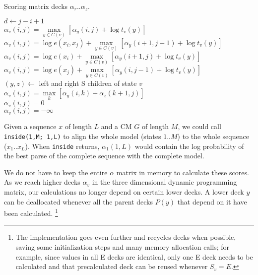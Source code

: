 \documentclass[11pt]{article}
\begin{document}
\begin{algorithm}
         {Scoring matrix decks $\alpha_r..\alpha_z$.}
\begin{algtab*}
       $d \leftarrow j-i+1$\\
       	$\alpha_v(i,j) = \max\limits_{y \in C(v)} \left[ \alpha_y(i,j)  + \log t_v(y) \right]$\\
	$\alpha_v(i,j) = \log e(x_i, x_j) + \max\limits_{y \in C(v)} \left[ \alpha_y(i+1,j-1) + \log t_v(y) \right]$\\
        $\alpha_v(i,j) = \log e(x_i) + \max\limits_{y \in C(v)} \left[ \alpha_y(i+1,j)   + \log t_v(y) \right]$\\
        $\alpha_v(i,j) = \log e(x_j) +      \max\limits_{y \in C(v)} \left[ \alpha_y(i,j-1)   + \log t_v(y) \right]$ \\
        $(y,z) \leftarrow $ left and right S children of state $v$\\
        $\alpha_v(i,j) = \max\limits_k \left[ \alpha_y(i,k) + \alpha_z(k+1,j) \right]$ \\
	$\alpha_v(i,j) = 0$\\
       \algelse
	$\alpha_v(i,j) = -\infty$\\
\end{algtab*}
\end{algorithm}

Given a sequence $x$ of length $L$ and a CM $G$ of length $M$, we
could call \texttt{inside(1,M; 1,L)} to align the whole model (states
$1..M$) to the whole sequence ($x_1..x_L$). When \texttt{inside}
returns, $\alpha_1(1,L)$ would contain the log probability of the best
parse of the complete sequence with the complete model. 

We do not have to keep the entire $\alpha$ matrix in memory to
calculate these scores.  As we reach higher decks $\alpha_v$ in the
three dimensional dynamic programming matrix, our calculations no
longer depend on certain lower decks. A lower deck $y$ can be
deallocated whenever all the parent decks $P(y)$ that depend on it
have been calculated. \footnote{The implementation goes even further
and recycles decks when possible, saving some initialization steps and
many memory allocation calls; for example, since values in all E decks
are identical, only one E deck needs to be calculated and that
precalculated deck can be reused whenever $S_v = E$.}
\end{document}
